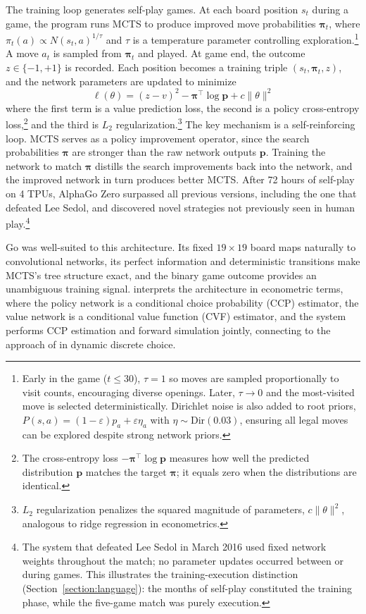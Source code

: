 The training loop generates self-play games. At each board position $s_t$ during a game, the program runs MCTS to produce improved move probabilities $\boldsymbol{\pi}_t$, where $\pi_t(a) \propto N(s_t, a)^{1/\tau}$ and $\tau$ is a temperature parameter controlling exploration.\footnote{Early in the game ($t \leq 30$), $\tau = 1$ so moves are sampled proportionally to visit counts, encouraging diverse openings. Later, $\tau \to 0$ and the most-visited move is selected deterministically. Dirichlet noise is also added to root priors, $P(s,a) = (1 - \varepsilon)p_a + \varepsilon \eta_a$ with $\eta \sim \text{Dir}(0.03)$, ensuring all legal moves can be explored despite strong network priors.} A move $a_t$ is sampled from $\boldsymbol{\pi}_t$ and played. At game end, the outcome $z \in \{-1, +1\}$ is recorded. Each position becomes a training triple $(s_t, \boldsymbol{\pi}_t, z)$, and the network parameters are updated to minimize
\begin{equation}
\ell(\theta) = (z - v)^2 - \boldsymbol{\pi}^\top \log \mathbf{p} + c \|\theta\|^2
\end{equation}
where the first term is a value prediction loss, the second is a policy cross-entropy loss,\footnote{The cross-entropy loss $-\boldsymbol{\pi}^\top \log \mathbf{p}$ measures how well the predicted distribution $\mathbf{p}$ matches the target $\boldsymbol{\pi}$; it equals zero when the distributions are identical.} and the third is $L_2$ regularization.\footnote{$L_2$ regularization penalizes the squared magnitude of parameters, $c\|\theta\|^2$, analogous to ridge regression in econometrics.} The key mechanism is a self-reinforcing loop. MCTS serves as a policy improvement operator, since the search probabilities $\boldsymbol{\pi}$ are stronger than the raw network outputs $\mathbf{p}$. Training the network to match $\boldsymbol{\pi}$ distills the search improvements back into the network, and the improved network in turn produces better MCTS. After 72 hours of self-play on 4 TPUs, AlphaGo Zero surpassed all previous versions, including the one that defeated Lee Sedol, and discovered novel strategies not previously seen in human play.\footnote{The system that defeated Lee Sedol in March 2016 used fixed network weights throughout the match; no parameter updates occurred between or during games. This illustrates the training-execution distinction (Section~\ref{section:language}): the months of self-play constituted the training phase, while the five-game match was purely execution.}

Go was well-suited to this architecture. Its fixed $19 \times 19$ board maps naturally to convolutional networks, its perfect information and deterministic transitions make MCTS's tree structure exact, and the binary game outcome provides an unambiguous training signal. \citet{Igami2020} interprets the architecture in econometric terms, where the policy network is a conditional choice probability (CCP) estimator, the value network is a conditional value function (CVF) estimator, and the system performs CCP estimation and forward simulation jointly, connecting to the approach of \citet{HotzMiller1993} in dynamic discrete choice.



